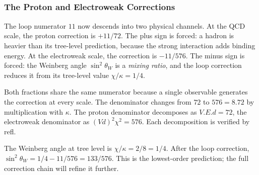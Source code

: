 \documentclass[11pt,a4paper]{book}
\def\cdot{.}%
\def\texttt#1{#1}%
\begin{document}
\begin{code}
\AgdaSymbol{=}\AgdaSpace{}%
\<%
\\
\>[0][@{}l@{\AgdaIndent{0}}]%
\>[2]\AgdaSymbol{\{}\AgdaSpace{}%
%
\>[23]\AgdaSymbol{=}\AgdaSpace{}%
\<%
\\
%
\>[2]\AgdaSymbol{;}\AgdaSpace{}%
%
\>[23]\AgdaSymbol{=}\AgdaSpace{}%
\<%
\\
%
\>[2]\AgdaSymbol{;}\AgdaSpace{}%
%
\>[23]\AgdaSymbol{=}\AgdaSpace{}%
\<%
\\
%
\>[2]\AgdaSymbol{;}\AgdaSpace{}%
\AgdaSpace{}%
\AgdaSymbol{=}\AgdaSpace{}%
\<%
\\
%
\>[2]\AgdaSymbol{;}\AgdaSpace{}%
%
\>[23]\AgdaSymbol{=}\AgdaSpace{}%
\<%
\\
%
\>[2]\AgdaSymbol{\}}\<%
\end{code}

\subsubsection*{The Proton and Electroweak Corrections}

The loop numerator $11$ now descends into two physical channels.
At the QCD scale, the proton correction is $+11/72$.  The plus sign
is forced: a hadron is heavier than its tree-level prediction, because
the strong interaction adds binding energy.  At the electroweak scale,
the correction is $-11/576$.  The minus sign is forced: the Weinberg
angle $\sin^2\!\theta_W$ is a \emph{mixing ratio}, and the loop
correction reduces it from its tree-level value $\chi/\kappa = 1/4$.

Both fractions share the same numerator because a single observable
generates the correction at every scale.  The denominator changes from
$72$ to $576 = 8 \cdot 72$ by multiplication with $\kappa$.  The
proton denominator decomposes as $V \cdot E \cdot d = 72$, the
electroweak denominator as $(V d)^2 \chi^2 = 576$.  Each
decomposition is verified by \texttt{refl}.

The Weinberg angle at tree level is $\chi/\kappa = 2/8 = 1/4$.
After the loop correction,
$\sin^2\!\theta_W = 1/4 - 11/576 = 133/576$.  This is the
lowest-order prediction; the full correction chain will refine it
further.
\end{document}
